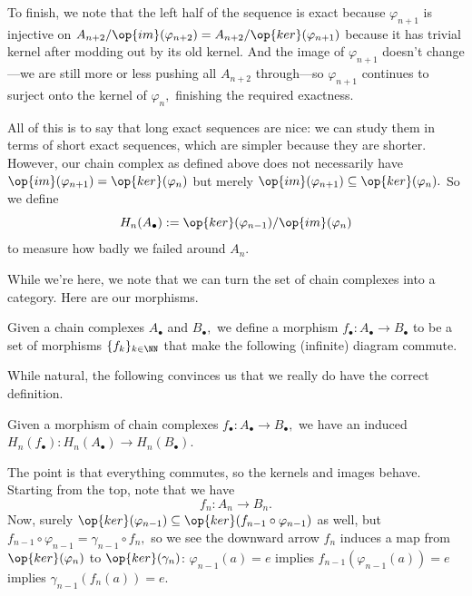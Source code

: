 To finish, we note that the left half of the sequence is exact because $\varphi_{n+1}$ is injective on $A_{n+2}/\op{im}(\varphi_{n+2})=A_{n+2}/\op{ker}(\varphi_{n+1})$ because it has trivial kernel after modding out by its old kernel. And the image of $\varphi_{n+1}$ doesn't change---we are still more or less pushing all $A_{n+2}$ through---so $\varphi_{n+1}$ continues to surject onto the kernel of $\varphi_n,$ finishing the required exactness.

All of this is to say that long exact sequences are nice: we can study them in terms of short exact sequences, which are simpler because they are shorter. However, our chain complex as defined above does not necessarily have $\op{im}(\varphi_{n+1})=\op{ker}(\varphi_n)$ but merely $\op{im}(\varphi_{n+1})\subseteq\op{ker}(\varphi_n).$ So we define
\[H_n(A_\bullet):=\op{ker}(\varphi_{n-1})/\op{im}(\varphi_n)\]
to measure how badly we failed around $A_n.$

While we're here, we note that we can turn the set of chain complexes into a category. Here are our morphisms.
\begin{definition}
    Given a chain complexes $A_\bullet$ and $B_\bullet,$ we define a morphism $f_\bullet:A_\bullet\to B_\bullet$ to be a set of morphisms $\{f_k\}_{k\in\NN}$ that make the following (infinite) diagram commute.
    \begin{center}
    \end{center}
\end{definition}
While natural, the following convinces us that we really do have the correct definition.
\begin{lemma}
    Given a morphism of chain complexes $f_\bullet:A_\bullet\to B_\bullet,$ we have an induced $H_n(f_\bullet):H_n(A_\bullet)\to H_n(B_\bullet).$
\end{lemma}
The point is that everything commutes, so the kernels and images behave. Starting from the top, note that we have
\[f_n:A_n\to B_n.\]
Now, surely $\op{ker}(\varphi_{n-1})\subseteq\op{ker}(f_{n-1}\circ\varphi_{n-1})$ as well, but $f_{n-1}\circ\varphi_{n-1}=\gamma_{n-1}\circ f_n,$ so we see the downward arrow $f_n$ induces a map from $\op{ker}(\varphi_n)$ to $\op{ker}(\gamma_n)$: $\varphi_{n-1}(a)=e$ implies $f_{n-1}(\varphi_{n-1}(a))=e$ implies $\gamma_{n-1}(f_n(a))=e.$

